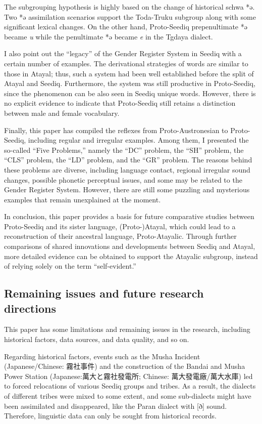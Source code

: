 \documentclass[12pt]{article}
\newcommand{\panf}{Proto-Austronesian\xspace}
\newcommand{\psedf}{Proto-Seediq\xspace}
\newcommand{\stgf}{Tgdaya\xspace}
\newcommand{\totrf}{Toda-Truku\xspace}
\begin{document}
The subgrouping hypothesis is highly based on the change of historical schwa *ə. Two *ə assimilation scenarios support the \totrf subgroup along with some significant lexical changes. On the other hand, \psedf prepenultimate *ə became \textit{u} while the penultimate *ə became \textit{e} in the \stgf dialect. 

I also point out the ``legacy'' of the Gender Register System in Seediq with a certain number of examples. The derivational strategies of words are similar to those in Atayal; thus, such a system had been well established before the split of Atayal and Seediq. Furthermore, the system was still productive in \psedf, since the phenomenon can be also seen in Seediq unique words. However, there is no explicit evidence to indicate that \psedf still retains a distinction between male and female vocabulary. 

Finally, this paper has compiled the reflexes from \panf to \psedf, including regular and irregular examples. Among them, I presented the so-called ``Five Problems,'' namely the ``DC'' problem, the ``SH'' problem, the ``CLS'' problem, the ``LD'' problem, and the ``GR'' problem. The reasons behind these problems are diverse, including language contact, regional irregular sound changes, possible phonetic perceptual issues, and some may be related to the Gender Register System. However, there are still some puzzling and mysterious examples that remain unexplained at the moment.

In conclusion, this paper provides a basis for future comparative studies between \psedf and its sister language, (Proto-)Atayal, which could lead to a reconstruction of their ancestral language, Proto-Atayalic. Through further comparisons of shared innovations and developments between Seediq and Atayal, more detailed evidence can be obtained to support the Atayalic subgroup, instead of relying solely on the term ``self-evident.'' 

\subsection{Remaining issues and future research directions}

This paper has some limitations and remaining issues in the research, including historical factors, data sources, and data quality, and so on. 

Regarding historical factors, events such as the Musha Incident (Japanese/Chinese: 霧社事件) and the construction of the Bandai and Musha Power Station (Japanese:萬大と霧社發電所; Chinese: 萬大發電廠/萬大水庫) led to forced relocations of various Seediq groups and tribes. As a result, the dialects of different tribes were mixed to some extent, and some sub-dialects might have been assimilated and disappeared, like the Paran dialect with [ð] sound. Therefore, linguistic data can only be sought from historical records.
\end{document}
